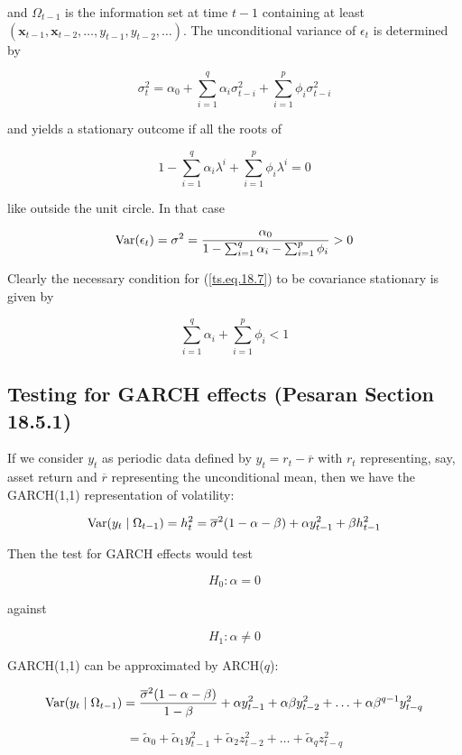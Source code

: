 and \(\Omega_{t-1}\) is the information set at time \(t - 1\) containing at least \((\boldsymbol{x}_{t-1}, \boldsymbol{x}_{t-2}, \ldots, y_{t-1}, y_{t-2}, \ldots)\). The unconditional variance of \(\epsilon_t\) is determined by 

\[
\sigma_t^2 = \alpha_0 + \sum_{i=1}^q \alpha_i \sigma_{t-i}^2 + \sum_{i=1}^p \phi_i \sigma_{t-i}^2
\]

and yields a stationary outcome if all the roots of

\[
1 - \sum_{i=1}^q \alpha_i \lambda^i + \sum_{i=1}^p \phi_i \lambda^i = 0
\]

like outside the unit circle. In that case

\begin{equation} \label{ts.eq.18.8}
\mathrm{Var}(\epsilon_t) = \sigma^2 = \frac{\alpha_0}{1 - \sum_{i=1}^q \alpha_i - \sum_{i=1}^p \phi_i } > 0
\end{equation}

Clearly the necessary condition for (\ref{ts.eq.18.7}) to be covariance stationary is given by

\[
\sum_{i=1}^q \alpha_i + \sum_{i=1}^p \phi_i < 1
\]

\subsection{Testing for GARCH effects (Pesaran Section 18.5.1)} \label{ts.pesaran.18.5.1}

If we consider \(y_t\) as periodic data defined by \(y_t = r_t - \overline{r}\) with \(r_t\) representing, say, asset return and \(\overline{r}\) representing the unconditional mean, then we have the GARCH(1,1) representation of volatility:

\[
\mathrm{Var}(y_t \mid \Omega_{t-1}) = h_t^2 =  \overline{\sigma}^2(1 - \alpha - \beta) + \alpha y_{t-1}^2 + \beta h_{t-1}^2
\]

Then the test for GARCH effects would test

\[
H_0:  \alpha = 0
\]

against 

\[
H_1: \alpha \neq 0 
\]

GARCH(1,1) can be approximated by ARCH(\(q\)):

\[
\mathrm{Var}(y_t \mid \Omega_{t-1}) = \frac{\overline{\sigma}^2(1 - \alpha - \beta)}{1 - \beta} + \alpha y_{t-1}^2 + \alpha \beta y_{t-2}^2 + \ldots + \alpha \beta^{q-1} y_{t-q}^2
\]

\[
= \tilde{\alpha}_0 + \tilde{\alpha}_1 y_{t-1}^2 + \tilde{\alpha}_2 z_{t-2}^2 + \ldots + \tilde{\alpha}_q z_{t-q}^2
\]

